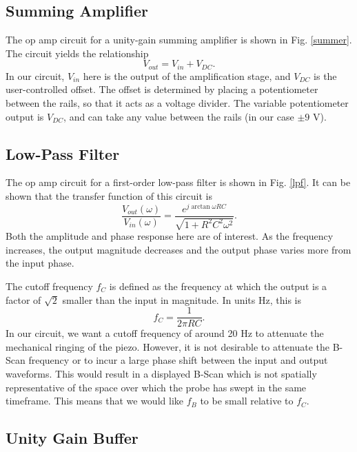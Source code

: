 \documentclass{article}
\begin{document}
\subsection{Summing Amplifier}

\par{The op amp circuit for a unity-gain summing amplifier is shown in Fig. \ref{summer}. The circuit yields the relationship
	\begin{equation}
		V_{out} = V_{in} + V_{DC}.
	\end{equation}
In our circuit, $V_{in}$ here is the output of the amplification stage, and $V_{DC}$ is the user-controlled offset. The offset is determined by placing a potentiometer between the rails, so that it acts as a voltage divider. The variable potentiometer output is $V_{DC}$, and can take any value between the rails (in our case $\pm 9$ V).}

\subsection{Low-Pass Filter}

\par{The op amp circuit for a first-order low-pass filter is shown in Fig. \ref{lpf}. It can be shown that the transfer function of this circuit is
	\begin{equation}
		\frac{V_{out}(\omega)}{V_{in}(\omega)} = \frac{e^{j\arctan{\omega RC}}}{\sqrt{1+R^2C^2\omega^2}}.
	\end{equation}
Both the amplitude and phase response here are of interest. As the frequency increases, the output magnitude decreases and the output phase varies more from the input phase.}
\par{The cutoff frequency $f_C$ is defined as the frequency at which the output is a factor of $\sqrt{2}$ smaller than the input in magnitude. In units Hz, this is
	\begin{equation}
		f_C = \frac{1}{2\pi RC}.
	\end{equation}
In our circuit, we want a cutoff frequency of around 20 Hz to attenuate the mechanical ringing of the piezo. However, it is not desirable to attenuate the B-Scan frequency or to incur a large phase shift between the input and output waveforms. This would result in a displayed B-Scan which is not spatially representative of the space over which the probe has swept in the same timeframe. This means that we would like $f_B$ to be small relative to $f_C$.}

\subsection{Unity Gain Buffer}
\end{document}
